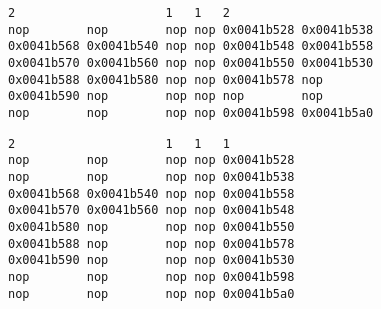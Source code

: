 \documentclass[titlepage, a4paper]{article}
\begin{document}
\begin{lstlisting}[caption=VLIW 3, basicstyle=\tiny]
2                     1   1   2
nop        nop        nop nop 0x0041b528 0x0041b538
0x0041b568 0x0041b540 nop nop 0x0041b548 0x0041b558
0x0041b570 0x0041b560 nop nop 0x0041b550 0x0041b530
0x0041b588 0x0041b580 nop nop 0x0041b578 nop
0x0041b590 nop        nop nop nop        nop		
nop        nop        nop nop 0x0041b598 0x0041b5a0	
\end{lstlisting}

\begin{lstlisting}[caption=VLIW 4, basicstyle=\tiny]
2                     1   1   1
nop        nop        nop nop 0x0041b528	
nop        nop        nop nop 0x0041b538	
0x0041b568 0x0041b540 nop nop 0x0041b558	
0x0041b570 0x0041b560 nop nop 0x0041b548	
0x0041b580 nop        nop nop 0x0041b550
0x0041b588 nop        nop nop 0x0041b578	
0x0041b590 nop        nop nop 0x0041b530		
nop        nop        nop nop 0x0041b598	
nop        nop        nop nop 0x0041b5a0
\end{lstlisting}
\end{document}
